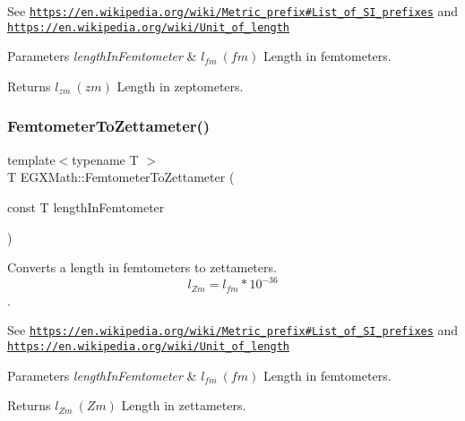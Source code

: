 See \href{https://en.wikipedia.org/wiki/Metric_prefix#List_of_SI_prefixes}{\tt https\+://en.\+wikipedia.\+org/wiki/\+Metric\+\_\+prefix\#\+List\+\_\+of\+\_\+\+S\+I\+\_\+prefixes} and \href{https://en.wikipedia.org/wiki/Unit_of_length}{\tt https\+://en.\+wikipedia.\+org/wiki/\+Unit\+\_\+of\+\_\+length} 
\begin{DoxyParams}{Parameters}
{\em length\+In\+Femtometer} & $ l_{fm}\ (fm)$ Length in femtometers. \\
\hline
\end{DoxyParams}
\begin{DoxyReturn}{Returns}
$ l_{zm}\ (zm)$ Length in zeptometers. 
\end{DoxyReturn}
\mbox{\label{group___e_g_x_math-_conversions-_length_conversions-_femtometer-_s_i_ga4906b22484dc1005dd962a943a967b50}} 
\subsubsection{\texorpdfstring{Femtometer\+To\+Zettameter()}{FemtometerToZettameter()}}
{\footnotesize\ttfamily template$<$typename T $>$ \\
T E\+G\+X\+Math\+::\+Femtometer\+To\+Zettameter (\begin{DoxyParamCaption}\item[{const T}]{length\+In\+Femtometer }\end{DoxyParamCaption})}



Converts a length in femtometers to zettameters. \[ l_{Zm}=l_{fm} * 10^{-36} \]. 

See \href{https://en.wikipedia.org/wiki/Metric_prefix#List_of_SI_prefixes}{\tt https\+://en.\+wikipedia.\+org/wiki/\+Metric\+\_\+prefix\#\+List\+\_\+of\+\_\+\+S\+I\+\_\+prefixes} and \href{https://en.wikipedia.org/wiki/Unit_of_length}{\tt https\+://en.\+wikipedia.\+org/wiki/\+Unit\+\_\+of\+\_\+length} 
\begin{DoxyParams}{Parameters}
{\em length\+In\+Femtometer} & $ l_{fm}\ (fm)$ Length in femtometers. \\
\hline
\end{DoxyParams}
\begin{DoxyReturn}{Returns}
$ l_{Zm}\ (Zm)$ Length in zettameters. 
\end{DoxyReturn}
